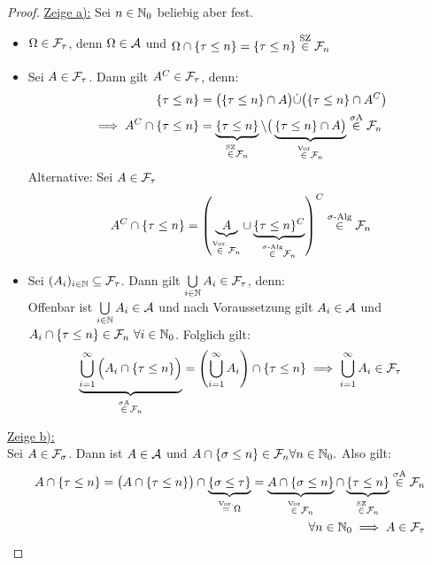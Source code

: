 \begin{proof} %
	\underline{Zeige a):} Sei $n\in\mathbb{N}_0$ beliebig aber fest.
	\begin{itemize} 
		\item $\Omega\in\mathcal{F}_\tau$, denn $\Omega\in\mathcal{A}$ und 
		$\begin{aligned}
			\Omega\cap\lbrace\tau\leq n\rbrace=\lbrace\tau\leq n\rbrace \stackrel{\text{SZ}}{\in} \mathcal{F}_n
		\end{aligned}$
		\item Sei $A \in \mathcal{F}_\tau$. Dann gilt $A^C \in \mathcal{F}_\tau$, denn:
		\begin{align*}
			\lbrace\tau\leq n\rbrace &=\big(\lbrace\tau\leq n\rbrace\cap A\big)\dot{\cup}\big(\lbrace\tau\leq n\rbrace\cap A^C\big)\\
			\implies A^C\cap\lbrace\tau\leq n\rbrace&=\underbrace{\lbrace\tau\leq n\rbrace}_{\stackrel{\text{SZ}}{\in}\mathcal{F}_n}\setminus\big(\underbrace{\lbrace\tau\leq n\rbrace\cap A\big)}_{\stackrel{\text{Vor}}{\in}\mathcal{F}_n}\stackrel{\sigma\text{A}}{\in}\mathcal{F}_n
		\end{align*}
		Alternative: Sei $A \in \mathcal{F}_\tau$
		\begin{align*}
			A^C\cap \lbrace \tau \leq n \rbrace = \left(\underbrace{A}_{\stackrel{\text{Vor.}}{\in} \mathcal{F}_n} \cup \underbrace{\lbrace \tau \leq n \rbrace^C}_{\stackrel{\sigma\text{-Alg}}{\in} \mathcal{F}_n} \right)^C \stackrel{\sigma\text{-Alg}}{\in}\mathcal{F}_n
		\end{align*}

		\item Sei $(A_i)_{i\in\mathbb{N}}\subseteq\mathcal{F}_\tau$. 
		Dann gilt $\bigcup\limits_{i\in\mathbb{N}} A_i  \in \mathcal{F}_\tau$, denn:\\
		Offenbar ist $\bigcup\limits_{i\in\mathbb{N}} A_i  \in\mathcal{A}$ und nach Voraussetzung gilt $A_i\in\mathcal{A}$ und\\ $A_i\cap\lbrace\tau\leq n\rbrace\in\mathcal{F}_n~\forall i\in\mathbb{N}_0$. 
		Folglich gilt:
		\begin{align*}
			\underbrace{\bigcup\limits_{i=1}^{\infty} \Big (A_i \cap \{\tau \leq n\} \Big )}_{\stackrel{\sigma\text{A}}{\in} \mathcal{F}_n} = \left( \bigcup\limits_{i=1}^{\infty} A_i \right)\cap \{\tau \leq n\} \implies  \bigcup\limits_{i=1}^{\infty} A_i \in \mathcal{F}_\tau
		\end{align*}
	\end{itemize}

	\underline{Zeige b):}\\
	Sei $A\in\mathcal{F}_\sigma$. 
	Dann ist $A\in\mathcal{A}$ und $A\cap\lbrace\sigma\leq n\rbrace\in\mathcal{F}_n\forall n\in\mathbb{N}_0.$ 
	Also gilt:
	\begin{align*}
		A \cap \lbrace\tau \leq n\rbrace
		\overset{}=
		\big(A \cap\lbrace\tau \leq n\rbrace\big)\cap\underbrace{\lbrace\sigma\leq\tau\rbrace}_{\overset{\text{Vor.}}{=}\Omega}
		=\underbrace{A\cap\lbrace\sigma\leq n\rbrace}_{\stackrel{\text{Vor}}{\in}\mathcal{F}_n}\cap\underbrace{\lbrace\tau\leq n\rbrace}_{\stackrel{\text{SZ}}{\in}\mathcal{F}_n} \stackrel{\sigma\text{A}}{\in} \mathcal{F}_n\\ \quad \forall n \in \mathbb{N}_0
		\implies A\in\mathcal{F}_\tau
	\end{align*}


\end{proof}
